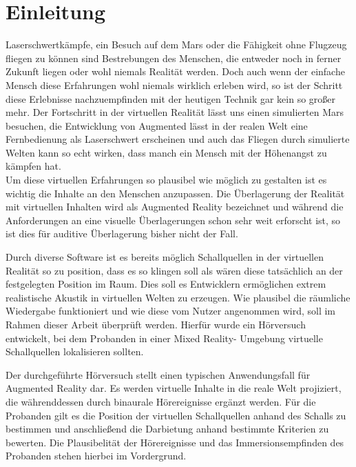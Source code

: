 \chapter{Einleitung}
Laserschwertkämpfe, ein Besuch auf dem Mars oder die Fähigkeit ohne Flugzeug fliegen zu können sind Bestrebungen des Menschen, die entweder noch in ferner Zukunft liegen oder wohl niemals Realität werden. Doch auch wenn der einfache Mensch diese Erfahrungen wohl niemals wirklich erleben wird, so ist der Schritt diese Erlebnisse nachzuempfinden mit der heutigen Technik gar kein so großer mehr. Der Fortschritt in der virtuellen Realität lässt uns einen simulierten Mars besuchen, die Entwicklung von Augmented lässt in der realen Welt eine Fernbedienung als Laserschwert erscheinen  und auch das Fliegen durch simulierte Welten kann so echt wirken, dass manch ein Mensch mit der Höhenangst zu kämpfen hat.\\

Um diese virtuellen Erfahrungen so plausibel wie möglich zu gestalten ist es wichtig die Inhalte an den Menschen anzupassen. Die Überlagerung der Realität mit virtuellen Inhalten wird als Augmented Reality bezeichnet und während die Anforderungen an  eine visuelle Überlagerungen schon sehr weit erforscht ist, so ist dies für auditive Überlagerung bisher nicht der Fall. 

Durch diverse Software ist es bereits möglich Schallquellen in der virtuellen Realität so zu position, dass es so klingen soll als wären diese tatsächlich an der festgelegten Position im Raum. Dies soll es Entwicklern ermöglichen extrem realistische Akustik in virtuellen Welten zu erzeugen. Wie plausibel die räumliche Wiedergabe funktioniert und wie diese vom Nutzer angenommen wird, soll im Rahmen dieser Arbeit überprüft werden. Hierfür wurde ein Hörversuch entwickelt, bei dem Probanden in einer Mixed Reality- Umgebung virtuelle Schallquellen lokalisieren sollten.

Der durchgeführte Hörversuch stellt einen typischen Anwendungsfall für Augmented Reality dar. Es werden virtuelle Inhalte in die reale Welt projiziert, die währenddessen durch binaurale Hörereignisse ergänzt werden. Für die Probanden gilt es die Position der virtuellen Schallquellen anhand des Schalls zu bestimmen und anschließend die Darbietung anhand bestimmte Kriterien zu bewerten. Die Plausibelität der Hörereignisse und das Immersionsempfinden des Probanden stehen hierbei im Vordergrund.

